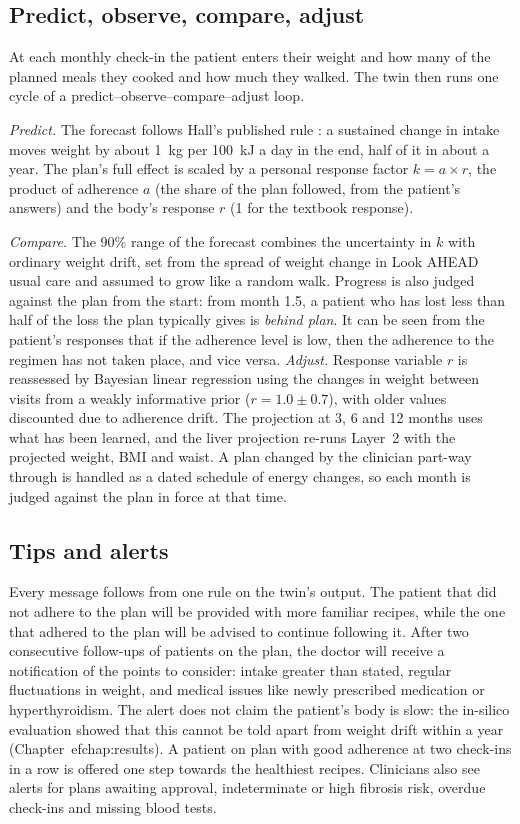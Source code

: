 \subsection{Predict, observe, compare, adjust}

At each monthly check-in the patient enters their weight and how many of the
planned meals they cooked and how much they walked. The twin then runs one
cycle of a predict--observe--compare--adjust loop.

\emph{Predict.} The forecast follows Hall's published rule
\cite{hall2011energy}: a sustained change in intake moves weight by about
1~kg per 100~kJ a day in the end, half of it in about a year. The plan's full
effect is scaled by a personal response factor $k = a \times r$, the product
of adherence $a$ (the share of the plan followed, from the patient's answers)
and the body's response $r$ (1 for the textbook response).

\emph{Compare.} The 90\% range of the forecast combines the uncertainty in
$k$ with ordinary weight drift, set from the spread of weight change in Look
AHEAD usual care and assumed to grow like a random walk. Progress is also
judged against the plan from the start: from month 1.5, a patient who has
lost less than half of the loss the plan typically gives is \emph{behind
plan}. It can be seen from the patient's responses that if the adherence level is low, 
then the adherence to the regimen has not taken place, and vice versa. 
\emph{Adjust.} Response variable $r$ is reassessed by Bayesian linear regression using the changes 
in weight between visits from a weakly informative prior ($r = 1.0 \pm 0.7$), with 
older values discounted due to adherence drift. The projection at 3, 6 and 12 months uses what has been learned, and
the liver projection re-runs Layer~2 with the projected weight, BMI and waist.
A plan changed by the clinician part-way through is handled as a dated
schedule of energy changes, so each month is judged against the plan in force
at that time.

\subsection{Tips and alerts}

Every message follows from one rule on the twin's output. The patient that did not adhere 
to the plan will be provided with more familiar recipes, while the one that adhered to 
the plan will be advised to continue following it. After two consecutive follow-ups of 
patients on the plan, the doctor will receive a notification of the points to consider: 
intake greater than stated, regular fluctuations in weight, and medical issues like newly 
prescribed medication or hyperthyroidism. The alert does not claim the
patient's body is slow: the in-silico evaluation showed that this cannot be
told apart from weight drift within a year (Chapter~ef{chap:results}). A patient on plan
with good adherence at two check-ins in a row is offered one step towards the
healthiest recipes. Clinicians also see alerts for plans awaiting approval,
indeterminate or high fibrosis risk, overdue check-ins and missing blood
tests.

